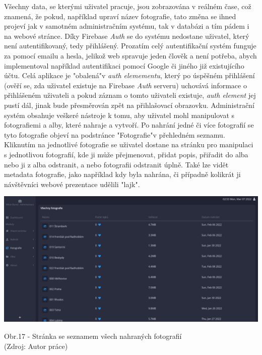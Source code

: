 \documentclass[12pt,a4paper]{report}
\begin{document}
  Všechny data, se kterými uživatel pracuje, jsou zobrazována v reálném čase, což znamená, že
  pokud, například upraví název fotografie, tato změna se ihned projeví jak v samotném
  administračním systému, tak v databázi a tím pádem i na webové stránce.
  Díky Firebase \emph{Auth} se do systému nedostane uživatel, který není autentifikovaný, tedy přihlášený.
  Prozatím celý autentifikační systém funguje za pomocí emailu a hesla, jelikož web spravuje jeden
  člověk a není potřeba, abych implementoval například autentifikaci pomocí Google či jiného již
  existujícího účtu.
  Celá aplikace je "obalená"\space v \emph{auth elemementu}, který po úspěšném přihlášení (ověří se, zda
  uživatel existuje na Firebase \emph{Auth} serveru) uchovává informace o přihlášeném uživateli a pokud
  záznam o tomto uživateli existuje, \emph{auth element} jej pustí dál, jinak bude přesměrován zpět na
  přihlašovací obrazovku.
  Administrační systém obsahuje veškeré nástroje k tomu, aby uživatel mohl manipulovat s
  fotografiemi a alby, které nahraje a vytvoří. Po nahrání jedné či více fotografií se tyto fotografie
  objeví na podstránce "Fotografie"\space v přehledném seznamu. Kliknutím na jednotlivé fotografie se
  uživatel dostane na stránku pro manipulaci s jednotlivou fotografií, kde ji může přejmenovat,
  přidat popis, přiřadit do alba nebo ji z alba odstranit, a nebo fotografii odstranit úplně. Také lze
  vidět metadata fotografie, jako například kdy byla nahrána, či případně kolikrát ji návštěvníci
  webové prezentace udělili "lajk".

  \vspace*{0.5cm}
  \noindent\includegraphics[width=\linewidth]{allPhotos.png}
  \begin{center}
    Obr.17 - Stránka se seznamem všech nahraných fotografií \\
    (Zdroj: Autor práce)
  \end{center}
  \vspace*{0.5cm}
\end{document}
